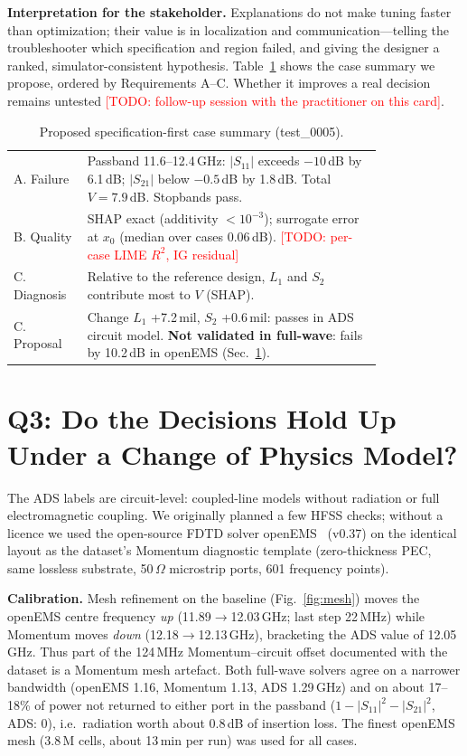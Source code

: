 \documentclass[conference,onecolumn,10pt]{IEEEtran}
\newcommand{\todo}[1]{\textcolor{red}{[TODO: #1]}}
\begin{document}
\textbf{Interpretation for the stakeholder.} Explanations do not make tuning faster than optimization; their value is in localization and communication---telling the troubleshooter which specification and region failed, and giving the designer a ranked, simulator-consistent hypothesis.
Table~\ref{tab:card} shows the case summary we propose, ordered by Requirements A--C.
Whether it improves a real decision remains untested \todo{follow-up session with the practitioner on this card}.

\begin{table}[htbp]
\centering
\caption{Proposed specification-first case summary (test\_0005).}
\label{tab:card}
\small
\begin{tabular}{p{0.13\linewidth}p{0.68\linewidth}}
\toprule
A. Failure & Passband 11.6--12.4\,GHz: $|S_{11}|$ exceeds $-10$\,dB by 6.1\,dB; $|S_{21}|$ below $-0.5$\,dB by 1.8\,dB. Total $V=7.9$\,dB. Stopbands pass. \\
B. Quality & SHAP exact (additivity $<10^{-3}$); surrogate error at $x_0$ (median over cases 0.06\,dB). \todo{per-case LIME $R^2$, IG residual} \\
C. Diagnosis & Relative to the reference design, $L_1$ and $S_2$ contribute most to $V$ (SHAP). \\
C. Proposal & Change $L_1$ +7.2\,mil, $S_2$ +0.6\,mil: passes in ADS circuit model. \textbf{Not validated in full-wave}: fails by 10.2\,dB in openEMS (Sec.~\ref{sec:q3}). \\
\bottomrule
\end{tabular}
\end{table}

\section{Q3: Do the Decisions Hold Up Under a Change of Physics Model?}
\label{sec:q3}
The ADS labels are circuit-level: coupled-line models without radiation or full electromagnetic coupling.
We originally planned a few HFSS checks; without a licence we used the open-source FDTD solver openEMS~\cite{liebig2013} (v0.37) on the identical layout as the dataset's Momentum diagnostic template (zero-thickness PEC, same lossless substrate, 50\,$\Omega$ microstrip ports, 601 frequency points).

\textbf{Calibration.} Mesh refinement on the baseline (Fig.~\ref{fig:mesh}) moves the openEMS centre frequency \emph{up} (11.89$\to$12.03\,GHz; last step 22\,MHz) while Momentum moves \emph{down} (12.18$\to$12.13\,GHz), bracketing the ADS value of 12.05\,GHz.
Thus part of the 124\,MHz Momentum--circuit offset documented with the dataset is a Momentum mesh artefact.
Both full-wave solvers agree on a narrower bandwidth (openEMS 1.16, Momentum 1.13, ADS 1.29\,GHz) and on about 17--18\% of power not returned to either port in the passband ($1-|S_{11}|^2-|S_{21}|^2$, ADS: 0), i.e.\ radiation worth about 0.8\,dB of insertion loss.
The finest openEMS mesh (3.8\,M cells, about 13\,min per run) was used for all cases.
\end{document}
